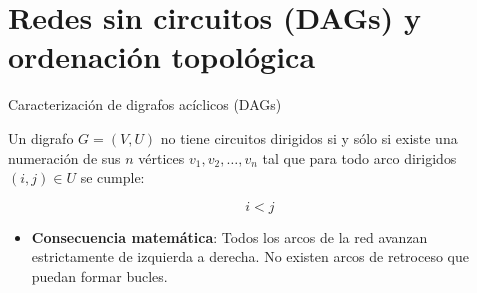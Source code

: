 \documentclass[
  ignorenonframetext,
]{beamer}
\providecommand{\tightlist}{%
  \setlength{\itemsep}{0pt}\setlength{\parskip}{0pt}}
\begin{document}
\section{Redes sin circuitos (DAGs) y ordenación
topológica}\label{redes-sin-circuitos-dags-y-ordenaciuxf3n-topoluxf3gica}

\begin{frame}{Caracterización de digrafos acíclicos (DAGs)}
\label{caracterizaciuxf3n-de-digrafos-acuxedclicos-dags}
\begin{tcolorbox}[enhanced jigsaw, colframe=quarto-callout-note-color-frame, toptitle=1mm, colback=white, colbacktitle=quarto-callout-note-color!10!white, titlerule=0mm, breakable, coltitle=black, opacityback=0, bottomrule=.15mm, title=\textcolor{quarto-callout-note-color}{\faInfo}\hspace{0.5em}{Caracterización mediante ordenación topológica}, rightrule=.15mm, arc=.35mm, leftrule=.75mm, left=2mm, toprule=.15mm, bottomtitle=1mm, opacitybacktitle=0.6]

Un digrafo \(G = (V, U)\) no tiene circuitos dirigidos si y sólo si
existe una numeración de sus \(n\) vértices \(v_1, v_2, \dots, v_n\) tal
que para todo arco dirigidos \((i, j) \in U\) se cumple:

\[i < j\]

\end{tcolorbox}

\begin{itemize}
\tightlist
\item
  \textbf{Consecuencia matemática}: Todos los arcos de la red avanzan
  estrictamente de izquierda a derecha. No existen arcos de retroceso
  que puedan formar bucles.
\end{itemize}
\end{frame}
\end{document}
